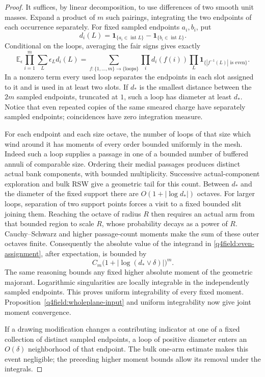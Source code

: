 \begin{proof}
It suffices, by linear decomposition, to use differences of two smooth
unit masses.  Expand a product of $m$ such pairings, integrating the two
endpoints of each occurrence separately.  For fixed sampled endpoints
$a_i,b_i$, put
\[
 d_i(L)=\mathbf1_{\{a_i\in\operatorname{int}L\}}
       -\mathbf1_{\{b_i\in\operatorname{int}L\}}.
\]
Conditional on the loops, averaging the fair signs gives exactly
\begin{equation}\label{q4field:even-assignment}
 \mathbb E_{\epsilon}\prod_{i=1}^m
       \sum_L\epsilon_Ld_i(L)
 =\sum_{f:\{1,\ldots,m\}\to\{\text{loops}\}}
       \prod_i d_i(f(i))
       \prod_L\mathbf1_{\{|f^{-1}(L)|\text{ is even}\}}.
\end{equation}
In a nonzero term every used loop separates the endpoints in each slot
assigned to it and is used in at least two slots.  If $d_*$ is the
smallest distance between the $2m$ sampled endpoints, truncated at $1$,
such a loop has diameter at least $d_*$.  Notice that even repeated
copies of the same smeared charge have separately sampled endpoints;
coincidences have zero integration measure.

For each endpoint and each size octave, the number of loops of that
size which wind around it has moments of every order bounded uniformly
in the mesh.  Indeed such a loop supplies a passage in one of a bounded
number of buffered annuli of comparable size.  Ordering their medial
passages produces distinct actual bank components, with bounded
multiplicity.  Successive actual-component exploration and bulk RSW
give a geometric tail for this count.  Between $d_*$ and the diameter
of the fixed support there are $O(1+|\log d_*|)$ octaves.  For larger
loops, separation of two support points forces a visit to a fixed
bounded slit joining them.  Reaching the octave of radius $R$ then
requires an actual arm from that bounded region to scale $R$, whose
probability decays as a power of $R$.  Cauchy--Schwarz and higher
passage-count moments make the sum of these outer octaves finite.
Consequently the absolute value of the integrand in
\eqref{q4field:even-assignment}, after expectation, is bounded by
\[
 C_m\bigl(1+|\log(d_*\vee\delta)|\bigr)^m.
\]
The same reasoning bounds any fixed higher absolute moment of the
geometric majorant.  Logarithmic singularities are locally integrable
in the independently sampled endpoints.  This proves uniform
integrability of every fixed moment.  Proposition~\ref{q4field:wholeplane-input}
and uniform integrability now give joint moment convergence.

If a drawing modification changes a contributing indicator at one of
a fixed collection of distinct sampled endpoints, a loop of positive
diameter enters an $O(\delta)$ neighborhood of that endpoint.  The
bulk one-arm estimate makes this event negligible; the preceding
higher moment bounds allow its removal under the integrals.
\end{proof}

